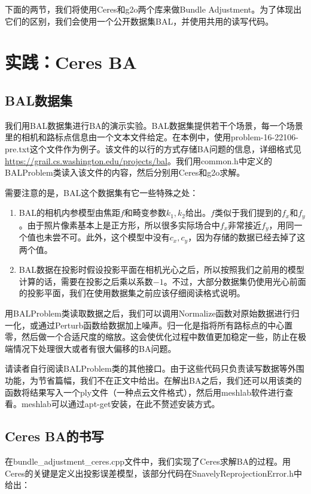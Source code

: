 下面的两节，我们将使用Ceres和g2o两个库来做Bundle Adjustment。为了体现出它们的区别，我们会使用一个公开数据集BAL\textsuperscript{\cite{bundleadjustmentinlarge}}，并使用共用的读写代码。

\section{实践：Ceres BA}
\subsection{BAL数据集}
我们用BAL数据集进行BA的演示实验。BAL数据集提供若干个场景，每一个场景里的相机和路标点信息由一个文本文件给定。在本例中，使用problem-16-22106-pre.txt这个文件作为例子。该文件的以行的方式存储BA问题的信息，详细格式见\url{https://grail.cs.washington.edu/projects/bal}。我们用common.h中定义的BALProblem类读入该文件的内容，然后分别用Ceres和g2o求解。

需要注意的是，BAL这个数据集有它一些特殊之处：
\begin{enumerate}
\item BAL的相机内参模型由焦距$f$和畸变参数$k_1,k_2$给出。$f$类似于我们提到的$f_x$和$f_y$。由于照片像素基本上是正方形，所以很多实际场合中$f_x$非常接近$f_y$，用同一个值也未尝不可。此外，这个模型中没有$c_x,c_y$，因为存储的数据已经去掉了这两个值。
\item BAL数据在投影时假设投影平面在相机光心之后，所以按照我们之前用的模型计算的话，需要在投影之后乘以系数$-1$。不过，大部分数据集仍使用光心前面的投影平面，我们在使用数据集之前应该仔细阅读格式说明。
\end{enumerate}

用BALProblem类读取数据之后，我们可以调用Normalize函数对原始数据进行归一化，或通过Perturb函数给数据加上噪声。归一化是指将所有路标点的中心置零，然后做一个合适尺度的缩放。这会使优化过程中数值更加稳定一些，防止在极端情况下处理很大或者有很大偏移的BA问题。

请读者自行阅读BALProblem类的其他接口。由于这些代码只负责读写数据等外围功能，为节省篇幅，我们不在正文中给出。在解出BA之后，我们还可以用该类的函数将结果写入一个ply文件（一种点云文件格式），然后用meshlab软件进行查看。meshlab可以通过apt-get安装，在此不赘述安装方式。

\subsection{Ceres BA的书写}
在bundle\_adjustment\_ceres.cpp文件中，我们实现了Ceres求解BA的过程。用Ceres的关键是定义出投影误差模型，该部分代码在SnavelyReprojectionError.h中给出：

